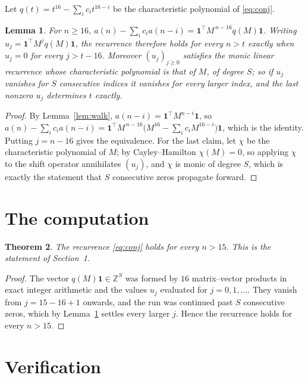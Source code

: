 \documentclass[11pt,a4paper]{article}
\theoremstyle{plain}
\newtheorem{theorem}{Theorem}
\newtheorem{lemma}[theorem]{Lemma}
\theoremstyle{definition}
\begin{document}
Let $q(t)=t^{16}-\sum_i c_i t^{16-i}$ be the characteristic polynomial of
\eqref{eq:conj}.

\begin{lemma}\label{lem:crit}
For $n\ge16$,
$a(n)-\sum_i c_i a(n-i)=\mathbf{1}^{\!\top}M^{\,n-16}q(M)\mathbf{1}$. Writing
$u_j=\mathbf{1}^{\!\top}M^{j}q(M)\mathbf{1}$, the recurrence therefore holds for every
$n>t$ exactly when $u_j=0$ for every $j>t-16$. Moreover $(u_j)_{j\ge0}$ satisfies the
monic linear recurrence whose characteristic polynomial is that of $M$, of degree $S$; so
if $u_j$ vanishes for $S$ consecutive indices it vanishes for every larger index, and the
last nonzero $u_j$ determines $t$ exactly.
\end{lemma}

\begin{proof}
By Lemma~\ref{lem:walk}, $a(n-i)=\mathbf{1}^{\!\top}M^{n-i}\mathbf{1}$, so
$a(n)-\sum_i c_i a(n-i)
=\mathbf{1}^{\!\top}M^{\,n-16}\bigl(M^{16}-\sum_i c_i M^{16-i}\bigr)
\mathbf{1}$, which is the identity. Putting $j=n-16$ gives the equivalence. For the
last claim, let $\chi$ be the characteristic polynomial of $M$; by Cayley--Hamilton
$\chi(M)=0$, so applying $\chi$ to the shift operator annihilates $(u_j)$, and $\chi$ is
monic of degree $S$, which is exactly the statement that $S$ consecutive zeros propagate
forward.
\end{proof}

\section{The computation}

\begin{theorem}
The recurrence \eqref{eq:conj} holds for every $n>15$. This is the statement of
Section~1.
\end{theorem}

\begin{proof}
The vector $q(M)\mathbf{1}\in\mathbb{Z}^{S}$ was formed by $16$ matrix--vector
products in exact integer arithmetic and the values $u_j$ evaluated for
$j=0,1,\dots$. They vanish from $j=15-16+1$ onwards, and the run was continued past
$S$ consecutive zeros, which by Lemma~\ref{lem:crit} settles every larger $j$. Hence the
recurrence holds for every $n>15$.
\end{proof}

\section{Verification}
\end{document}
